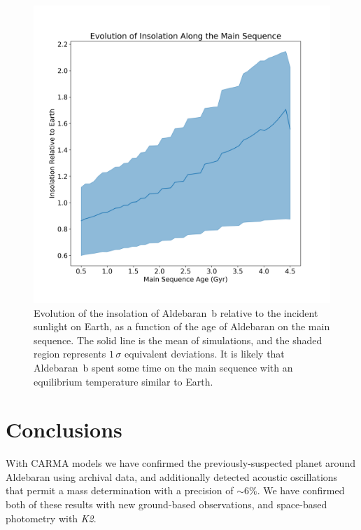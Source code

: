 \documentclass[modern]{aastex61}
\newcommand{\ktwo}{\emph{K2}\xspace}
\begin{document}
\begin{figure}
\centering
\includegraphics[width=\textwidth]{insolation.png}
\caption{Evolution of the insolation of Aldebaran~b relative to the incident sunlight on Earth, as a function of the age of Aldebaran on the main sequence. The solid line is the mean of simulations, and the shaded region represents $1\,\sigma$ equivalent deviations. It is likely that Aldebaran~b spent some time on the main sequence with an equilibrium temperature similar to Earth.}
\label{insolation}
\end{figure}

\section{Conclusions}

With CARMA models we have confirmed the previously-suspected planet around Aldebaran using archival data, and additionally detected acoustic oscillations that permit a mass determination with a precision of $\sim 6\%$. We have confirmed both of these results with new ground-based observations, and space-based photometry with \ktwo.
\end{document}
